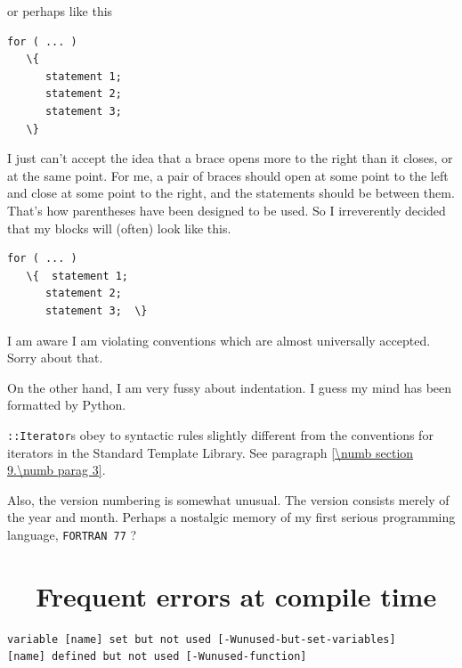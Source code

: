 or perhaps like this

\begin{Verbatim}[commandchars=\\\{\},formatcom=\small\tt,baselinestretch=0.94]
   for ( ... )
   \{
      statement 1;
      statement 2;
      statement 3;
   \}
\end{Verbatim}

I just can't accept the idea that a brace opens more to the right than it closes, or at the
same point.
For me, a pair of braces should open at some point to the left and close at some point to the
right, and the statements should be between them.
That's how parentheses have been designed to be used.
So I irreverently decided that my blocks will (often) look like this.

\begin{Verbatim}[commandchars=\\\{\},formatcom=\small\tt,baselinestretch=0.94]
   for ( ... )
   \{  statement 1;
      statement 2;
      statement 3;  \}
\end{Verbatim}

I am aware I am violating conventions which are almost universally accepted. Sorry about that.

On the other hand, I am very fussy about indentation.
I guess my mind has been formatted by Python.

{\small\tt{}::Iterator}s obey to syntactic rules slightly different from the conventions for
iterators in the Standard Template Library.
See paragraph \ref{\numb section 9.\numb parag 3}.

Also, the version numbering is somewhat unusual.
The version consists merely of the year and month.
Perhaps a nostalgic memory of my first serious programming language, {\tt FORTRAN 77} ?


\section{~~Frequent errors at compile time}\label{\numb section 11.\numb parag 13}

\begin{Verbatim}[commandchars=\\\{\},formatcom=\small\tt,baselinestretch=0.94]
variable [name] set but not used [-Wunused-but-set-variables]
[name] defined but not used [-Wunused-function]
\end{Verbatim}

